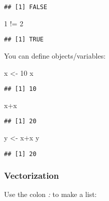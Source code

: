 \documentclass[
]{article}
\newenvironment{Shaded}{\begin{snugshade}}{\end{snugshade}}
\newcommand{\DecValTok}[1]{\textcolor[rgb]{0.00,0.00,0.81}{#1}}
\newcommand{\NormalTok}[1]{#1}
\newcommand{\OtherTok}[1]{\textcolor[rgb]{0.56,0.35,0.01}{#1}}
\newcommand{\SpecialCharTok}[1]{\textcolor[rgb]{0.00,0.00,0.00}{#1}}
\begin{document}
\begin{verbatim}
## [1] FALSE
\end{verbatim}

\begin{Shaded}
\begin{Highlighting}[]
\DecValTok{1} \SpecialCharTok{!=} \DecValTok{2}
\end{Highlighting}
\end{Shaded}

\begin{verbatim}
## [1] TRUE
\end{verbatim}

You can define objects/variables:

\begin{Shaded}
\begin{Highlighting}[]
\NormalTok{x }\OtherTok{\textless{}{-}} \DecValTok{10}
\NormalTok{x}
\end{Highlighting}
\end{Shaded}

\begin{verbatim}
## [1] 10
\end{verbatim}

\begin{Shaded}
\begin{Highlighting}[]
\NormalTok{x}\SpecialCharTok{+}\NormalTok{x}
\end{Highlighting}
\end{Shaded}

\begin{verbatim}
## [1] 20
\end{verbatim}

\begin{Shaded}
\begin{Highlighting}[]
\NormalTok{y }\OtherTok{\textless{}{-}}\NormalTok{ x}\SpecialCharTok{+}\NormalTok{x}
\NormalTok{y}
\end{Highlighting}
\end{Shaded}

\begin{verbatim}
## [1] 20
\end{verbatim}

\hypertarget{vectorization}{%
\subsubsection{Vectorization}\label{vectorization}}

Use the colon \emph{:} to make a list:
\end{document}
